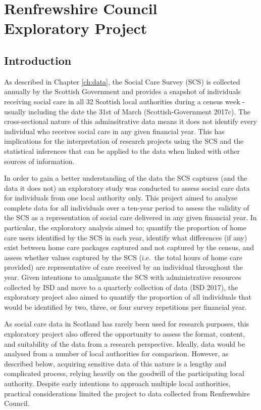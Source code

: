 \documentclass[]{article}
\title{}
\author{}
\date{}
\begin{document}
\chapter[Renfrewshire Council Exploratory Project]{Renfrewshire Council \\ Exploratory Project}\label{ch:renfrew}

\section{Introduction}\label{renf-intro}

As described in Chapter \ref{ch:data}, the Social Care Survey (SCS) is
collected annually by the Scottish Government and provides a snapshot of
individuals receiving social care in all 32 Scottish local authorities
during a census week - usually including the date the 31st of March
(Scottish-Government 2017c). The cross-sectional nature of this
adminsitrative data means it does not identify every individual who
receives social care in any given financial year. This has implications
for the interpretation of research projects using the SCS and the
statistical inferences that can be applied to the data when linked with
other sources of information.

In order to gain a better understanding of the data the SCS captures
(and the data it does not) an exploratory study was conducted to assess
social care data for individuals from one local authority only. This
project aimed to analyse complete data for all individuals over a
ten-year period to assess the validity of the SCS as a representation of
social care delivered in any given financial year. In particular, the
exploratory analysis aimed to; quantify the proportion of home care
users identified by the SCS in each year, identify what differences (if
any) exist between home care packages captured and not captured by the
census, and assess whether values captured by the SCS (i.e.~the total
hours of home care provided) are representative of care received by an
individual throughout the year. Given intentions to amalgamate the SCS
with administrative resources collected by ISD and move to a quarterly
collection of data (ISD 2017), the exploratory project also aimed to
quantify the proportion of all individuals that would be identified by
two, three, or four survey repetitions per financial year.

As social care data in Scotland has rarely been used for research
purposes, this exploratory project also offered the opportunity to
assess the format, content, and suitability of the data from a research
perspective. Ideally, data would be analysed from a number of local
authorities for comparison. However, as described below, acquiring
sensitive data of this nature is a lengthy and complicated process,
relying heavily on the goodwill of the participating local authority.
Despite early intentions to approach multiple local authorities,
practical considerations limited the project to data collected from
Renfrewshire Council.
\end{document}
